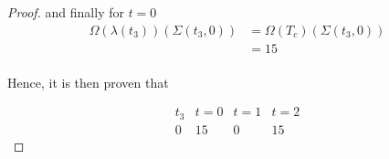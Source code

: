\documentclass{article}
\begin{document}
\begin{proof}
	and finally for \(t = 0\)
	\begin{align*}
		\Omega(\lambda(t_{3}))(\Sigma(t_{3}, 0)) &= \Omega(T_{c})(\Sigma(t_{3}, 0)) \\
		& = 15 \\ 
	\end{align*}

	Hence, it is then proven that

	\begin{displaymath}
		\begin{array}{|c|c|c|c|}
			t_{3} & t = 0 & t = 1 & t = 2\\
 		\hline
			0 & 15 & 0 & 15
 		\end{array}
	\end{displaymath}
\end{proof}
\end{document}
